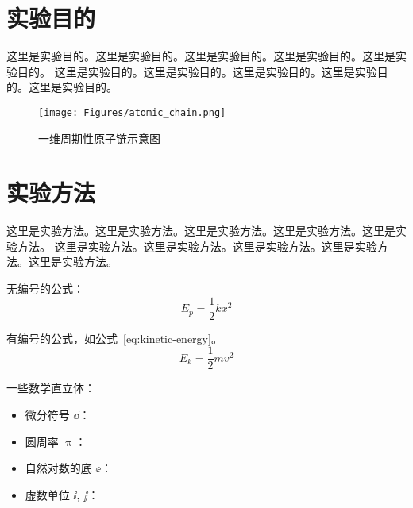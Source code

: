 
\setcounter{page}{1}


\titleformat{\section}{\raggedright\Large\bfseries}{\thesection}{1em}{}

\section{实验目的}

这里是实验目的。这里是实验目的。这里是实验目的。这里是实验目的。这里是实验目的。
这里是实验目的。这里是实验目的。这里是实验目的。这里是实验目的。这里是实验目的。

\begin{figure}[!htp]
    \centering
    \texttt{[image: Figures/atomic\_chain.png]}
    \caption{一维周期性原子链示意图}
    \label{fig:atomic-chain}
\end{figure}

\section{实验方法}\label{sec:exp-method}

这里是实验方法。这里是实验方法。这里是实验方法。这里是实验方法。这里是实验方法。
这里是实验方法。这里是实验方法。这里是实验方法。这里是实验方法。这里是实验方法。

无编号的公式：
\begin{equation*}
    E_p = \frac{1}{2} k x^2
\end{equation*}

有编号的公式，如公式~\ref{eq:kinetic-energy}。
\begin{equation}
    E_k = \frac{1}{2} m v^2
    \label{eq:kinetic-energy}
\end{equation}


一些数学直立体：
\begin{itemize}
  \item 微分符号 $\dd$：
  \item 圆周率 $\uppi$：
  \item 自然对数的底 $\ee$：
  \item 虚数单位 $\ii$, $\jj$： 
\end{itemize}


